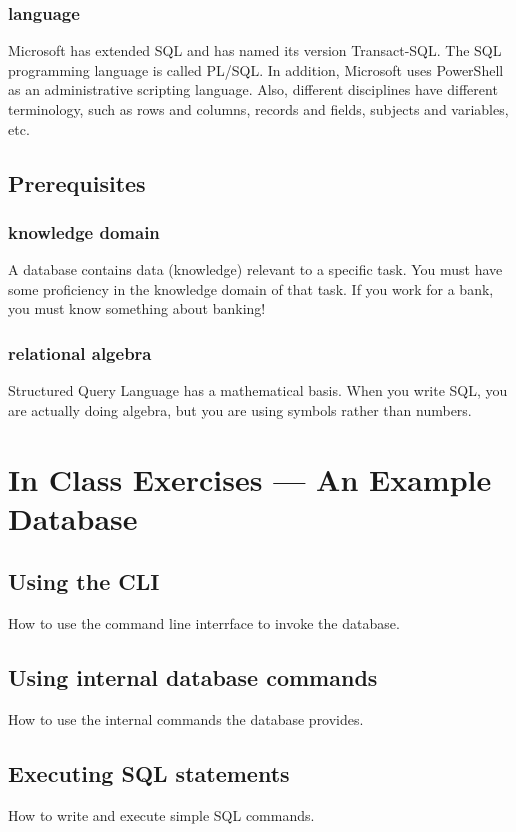 \documentclass{article}
\begin{document}
            \subsubsection{language}
            Microsoft has extended SQL and has named its version Transact-SQL. The SQL programming language is called PL/SQL. In addition, Microsoft uses PowerShell as an administrative scripting language. Also, different disciplines have different terminology, such as rows and columns, records and fields, subjects and variables, etc.

        
        \subsection{Prerequisites}
            \subsubsection{knowledge domain}
            A database contains data (knowledge) relevant to a specific task. You must have some proficiency in the knowledge domain of that task. If you work for a bank, you must know something about banking!
            \subsubsection{relational algebra}
            Structured Query Language has a mathematical basis. When you write SQL, you are actually doing algebra, but you are using symbols rather than numbers.

    \section{In Class Exercises --- An Example Database}
        \subsection{Using the CLI}
How to use the command line interrface to invoke the database.

        \subsection{Using internal database commands}
How to use the internal commands the database provides.

        \subsection{Executing SQL statements}
How to write and execute simple SQL commands.
        
\end{document}
